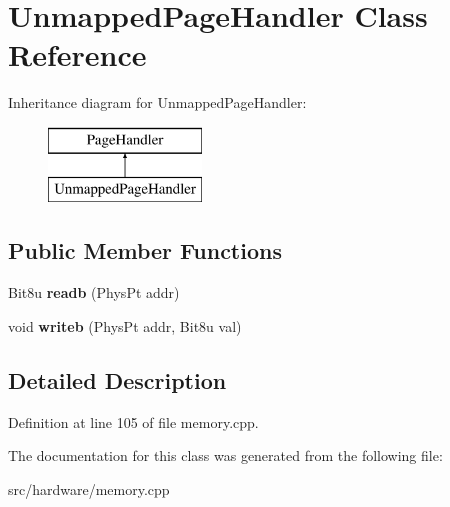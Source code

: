 \hypertarget{classUnmappedPageHandler}{\section{Unmapped\-Page\-Handler Class Reference}
\label{classUnmappedPageHandler}
}
Inheritance diagram for Unmapped\-Page\-Handler\-:\begin{figure}[H]
\begin{center}
\leavevmode
\includegraphics[height=2.000000cm]{classUnmappedPageHandler}
\end{center}
\end{figure}
\subsection*{Public Member Functions}
\begin{DoxyCompactItemize}
\item 
\hypertarget{classUnmappedPageHandler_a59a7f4fa4f908b845ff04d825c9c327a}{Bit8u {\bfseries readb} (Phys\-Pt addr)}\label{classUnmappedPageHandler_a59a7f4fa4f908b845ff04d825c9c327a}

\item 
\hypertarget{classUnmappedPageHandler_a76a79c96458249d3a82cf67fb4af5928}{void {\bfseries writeb} (Phys\-Pt addr, Bit8u val)}\label{classUnmappedPageHandler_a76a79c96458249d3a82cf67fb4af5928}

\end{DoxyCompactItemize}


\subsection{Detailed Description}


Definition at line 105 of file memory.\-cpp.



The documentation for this class was generated from the following file\-:\begin{DoxyCompactItemize}
\item 
src/hardware/memory.\-cpp\end{DoxyCompactItemize}
